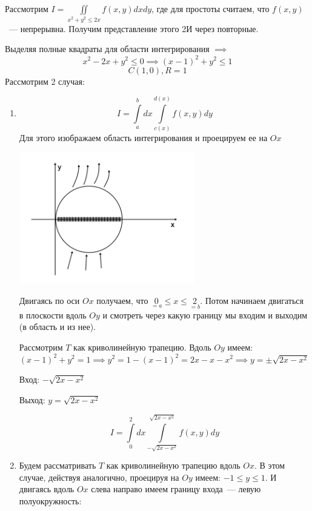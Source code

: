 \documentclass[../../main.tex]{subfiles}
\begin{document}
\begin{exmp}
	Рассмотрим $ I = \iint\limits_{x^2 + y^2 \leq 2x} 
	f \left(x, y \right) dxdy $, 
	где для простоты считаем, что $ f \left( x, y \right) $~---  непрерывна. 
	Получим представление этого 2И через повторные.
	
	Выделяя полные квадраты для области интегрирования $ \implies $
	\[
	x^2 -2x + y^2 \leq 0 \implies (x-1)^2 + y^2 \leq 1
	\]
	\[
	C \left( 1, 0 \right), R = 1
	\]
	Рассмотрим 2 случая:
	\begin{enumerate}
		\item   \[ I = \int\limits_a^b dx \int\limits_{c \left( x \right) } ^ 
		 {d \left( x \right) } f \left( x, y \right) dy \]
		 Для этого изображаем область интегрирования и проецируем ее на $ Ox $
		 
		 \begin{center}
		 	\includegraphics[width=0.6\textwidth]{lec13_circle_case1.png}
		 \end{center}
		 
		 Двигаясь по оси $ Ox $ получаем, что 
		 $ \underset{ = a} {0} \leq x \leq \underset{ = b} {2} $.
		 Потом начинаем двигаться в плоскости вдоль $ Oy $ и смотреть
		 через какую границу мы входим и выходим (в область и из нее).
		 
		 Рассмотрим $ T $ как криволинейную трапецию. Вдоль $ Oy $ имеем:
		 $ \left( x - 1\right)^2 + y^2 = 1 \implies 
		 y^2 = 1 - \left( x - 1 \right)^2 = 
		 2x - x - x^2 \implies y = \pm \sqrt{ 2x - x^2 } $
		 
		 Вход: $ -\sqrt{2x - x^2 }$
		 
		 Выход: $ y = \sqrt{2x - x^2 } $
		 
		 \[ I = \int\limits_0^2 dx \int\limits_{-\sqrt{2x - x^2}} ^ 
		 {\sqrt{2x - x^2}} f \left( x, y\right) dy \]
		\item Будем рассматривать $ T $ как криволинейную трапецию вдоль $ Ox $.
		В этом случае, действуя аналогично, проецируя на $ Oy $ имеем: 
		$ -1 \leq y \leq 1$. И двигаясь вдоль $ Ox $ слева направо 
		имеем границу входа~--- левую полуокружность:
		

\end{enumerate}
\end{exmp}
\end{document}
